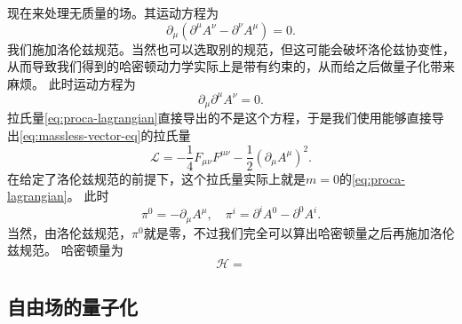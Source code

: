 \documentclass[hyperref, UTF8, a4paper]{ctexart}
\begin{document}
现在来处理无质量的场。其运动方程为
\[
    \partial_\mu (\partial^\mu A^\nu - \partial^\nu A^\mu) = 0.
\]
我们施加洛伦兹规范。当然也可以选取别的规范，但这可能会破坏洛伦兹协变性，从而导致我们得到的哈密顿动力学实际上是带有约束的，从而给之后做量子化带来麻烦。
此时运动方程为
\begin{equation}
    \partial_\mu \partial^\mu A^\nu = 0.
    \label{eq:massless-vector-eq}
\end{equation}
拉氏量\eqref{eq:proca-lagrangian}直接导出的不是这个方程，于是我们使用能够直接导出\eqref{eq:massless-vector-eq}的拉氏量
\begin{equation}
    \mathcal{L} = - \frac{1}{4} F_{\mu \nu} F^{\mu \nu} - \frac{1}{2} (\partial_\mu A^\mu)^2.
\end{equation}
在给定了洛伦兹规范的前提下，这个拉氏量实际上就是$m=0$的\eqref{eq:proca-lagrangian}。
此时
\begin{equation}
    \pi^0 = -\partial_\mu A^\mu, \quad \pi^i = \partial^i A^0 - \partial^0 A^i.
\end{equation}
当然，由洛伦兹规范，$\pi^0$就是零，不过我们完全可以算出哈密顿量之后再施加洛伦兹规范。
哈密顿量为 %
\begin{equation}
    \mathcal{H} = 
\end{equation}

\subsection{自由场的量子化}\label{sec:quantization-of-free-fields}
\end{document}
